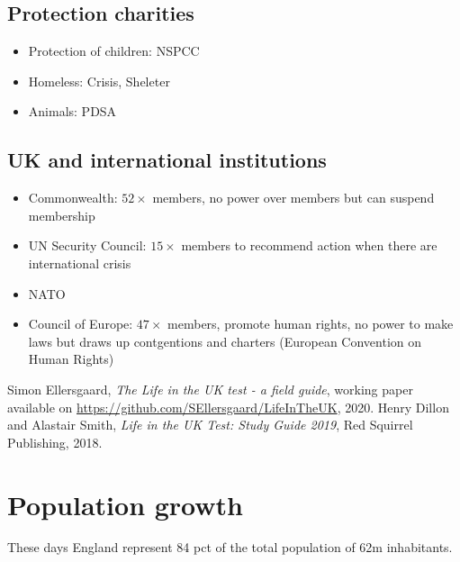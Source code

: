 \documentclass{amsart}
\begin{document}
\subsection{Protection charities}
	
\begin{itemize}
	\item Protection of children: NSPCC
	\item Homeless: Crisis, Sheleter
	\item Animals: PDSA
\end{itemize}
	

\subsection{UK and international institutions}
	\begin{itemize}
		\item Commonwealth: $52\times$ members, no power over members but can suspend membership
		\item UN Security Council: $15\times$ members to recommend action when there are international crisis
		\item NATO
		\item Council of Europe: $47\times$ members, promote human rights, no power to make laws but draws up contgentions and charters (European Convention on Human Rights)
	\end{itemize}

\begin{thebibliography}{2}
    Simon Ellersgaard,
    \emph{The Life in the UK test - a field guide},  working paper available on  \url{https://github.com/SEllersgaard/LifeInTheUK}, 2020.
     Henry Dillon and Alastair Smith, 
    \emph{Life in the UK Test: Study Guide 2019},  Red Squirrel Publishing, 2018.
\end{thebibliography}

\newpage
\appendix

\section{Population growth}

These days England represent 84 pct of the total population of 62m inhabitants.
\end{document}
